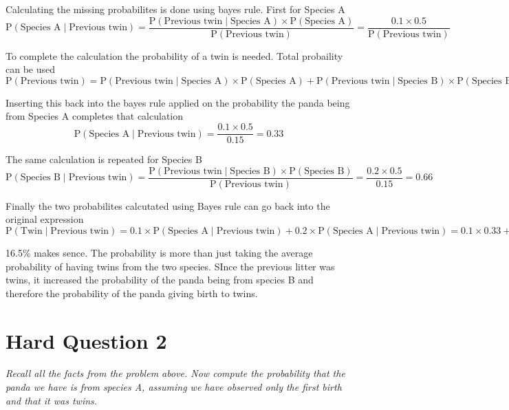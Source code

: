 \documentclass[]{article}
\begin{document}
Calculating the missing probabilites is done using bayes rule. First for
Species A
\[ \textrm{P}(\textrm{Species A} \mid \textrm{Previous twin})    = \frac{ \textrm{P}( \textrm{Previous twin} \mid \textrm{Species A} ) \times \textrm{P}(\textrm{Species A})}{\textrm{P}( \textrm{Previous twin})} = \frac{0.1 \times 0.5}{\textrm{P}(\textrm{Previous twin})}\]

To complete the calculation the probability of a twin is needed. Total
probaility can be used
\[ \textrm{P}(\textrm{Previous twin}) = \textrm{P}(\textrm{Previous twin} \mid \textrm{Species A}) \times \textrm{P}(\textrm{Species A}) +  \textrm{P}(\textrm{Previous twin} \mid \textrm{Species B}) \times \textrm{P}(\textrm{Species B}) = 0.1 \times 0.5 + 0.2 \times 0.5 = 0.15 \]

Inserting this back into the bayes rule applied on the probability the
panda being from Species A completes that calculation
\[ \textrm{P}(\textrm{Species A} \mid \textrm{Previous twin})    =  \frac{0.1 \times 0.5}{0.15} = 0.33\]

The same calculation is repeated for Species B
\[ \textrm{P}(\textrm{Species B} \mid \textrm{Previous twin})    =  \frac{ \textrm{P}( \textrm{Previous twin} \mid \textrm{Species B} ) \times \textrm{P}(\textrm{Species B})}{\textrm{P}( \textrm{Previous twin})} = \frac{0.2 \times 0.5}{0.15} = 0.66 \]

Finally the two probabilites calcutated using Bayes rule can go back
into the original expression
\[  \textrm{P}(\textrm{Twin} \mid \textrm{Previous twin})  =  0.1 \times\textrm{P}(\textrm{Species A} \mid \textrm{Previous twin}) + 0.2 \times \textrm{P}(\textrm{Species A} \mid \textrm{Previous twin}) = 0.1  \times  0.33  + 0.2  \times 0.66  =  0.165 = 16.5\%\]

16.5\% makes sence. The probability is more than just taking the average
probability of having twins from the two species. SInce the previous
litter was twins, it increased the probability of the panda being from
species B and therefore the probability of the panda giving birth to
twins.

\section{Hard Question 2}\label{hard-question-2}

\emph{Recall all the facts from the problem above. Now compute the
probability that the panda we have is from species A, assuming we have
observed only the first birth and that it was twins.}
\end{document}
